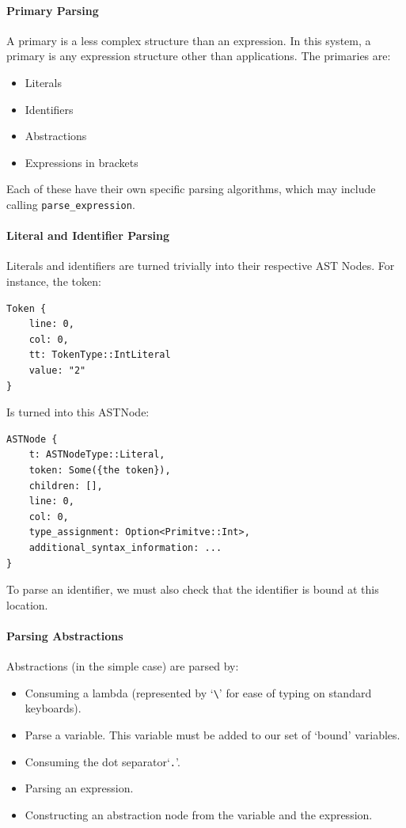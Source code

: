 \paragraph{Primary Parsing}
\label{impl:parsing_primary}
A primary is a less complex structure than an expression. In this system, a primary is any expression structure other than applications. The primaries are:
\begin{itemize}
    \item Literals
    \item Identifiers
    \item Abstractions
    \item Expressions in brackets
\end{itemize}
Each of these have their own specific parsing algorithms, which may include calling \verb|parse_expression|. 

\paragraph{Literal and Identifier Parsing}
Literals and identifiers are turned trivially into their respective AST Nodes. For instance, the token:
\begin{lstlisting}[language=Rust_boxed]
Token {
    line: 0,
    col: 0,
    tt: TokenType::IntLiteral
    value: "2"
}
\end{lstlisting}
Is turned into this ASTNode:
\begin{lstlisting}[language=Rust_boxed]
ASTNode {
    t: ASTNodeType::Literal,
    token: Some({the token}),
    children: [],
    line: 0,
    col: 0,
    type_assignment: Option<Primitve::Int>,
    additional_syntax_information: ...
}
\end{lstlisting}

\noindent To parse an identifier, we must also check that the identifier is bound at this location.

\paragraph{Parsing Abstractions}
Abstractions (in the simple case) are parsed by:
\begin{itemize}
    \item Consuming a lambda (represented by `\verb|\|' for ease of typing on standard keyboards).
    \item Parse a variable. This variable must be added to our set of `bound' variables.
    \item Consuming the dot separator`\verb|.|'.
    \item Parsing an expression.
    \item Constructing an abstraction node from the variable and the expression.
\end{itemize}

